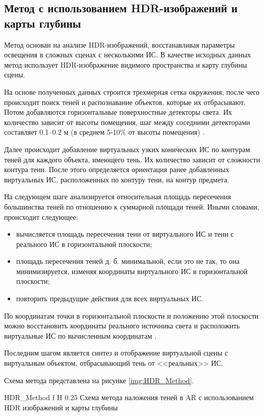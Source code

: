 \subsection{Метод с использованием HDR-изображений и карты глубины}

Метод основан на анализе HDR-изображений, восстанавливая параметры освещения в сложных сценах с несколькими ИС. В качестве исходных данных метод использует HDR-изображение видимого пространства и карту глубины сцены.

На основе полученных данных строится трехмерная сетка окружения, после чего происходит поиск теней и распознавание объектов, которые их отбрасывают. Потом добавляются горизонтальные поверхностные детекторы света. Их количество зависит от высоты помещения, шаг между соседними детекторами составляет 0.1–0.2 м (в среднем 5-10\% от высоты помещения) \cite{hdr_method}.

Далее происходит добавление виртуальных узких конических ИС по контурам теней для каждого объекта, имеющего тень. Их количество зависит от сложности контура тени. После этого определяется ориентация ранее добавленных виртуальных ИС,  расположенных по контуру тени, на контур предмета.

На следующем шаге анализируется относительная площадь пересечения большинства теней по отношению к суммарной площади теней. Иными словами, происходит следующее:

\begin{itemize}
	\item вычисляется площадь пересечения тени от виртуального ИС и тени с реального ИС в горизонтальной плоскости;
	\item площадь пересечения теней д. б. минимальной, если это не так, то она минимизируется, изменяя координаты виртуального ИС в горизонтальной плоскости;
	\item повторить предыдущие действия для всех виртуальных ИС.
\end{itemize}

По координатам точки в горизонтальной плоскости и положению этой плоскости можно восстановить координаты реального источника света и расположить виртуальные ИС по вычисленным координатам \cite{hdr_method}.

Последним шагом является синтез и отображение виртуальной сцены с виртуальным объектом, отбрасывающий тень от <<реальных>> ИС.

Схема метода представлена на рисунке \ref{img:HDR_Method}.

	{HDR_Method}
	{f}
	{H}
	{0.25\textwidth}
	{Схема метода наложения теней в AR с использованием HDR изображений и карты глубины}

